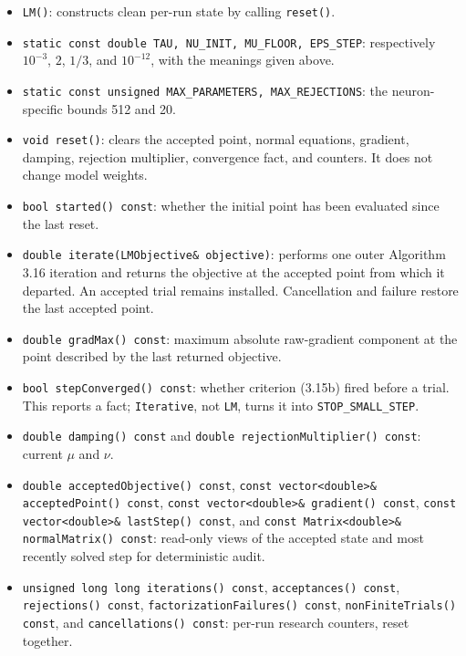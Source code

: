 \begin{itemize}
\item \texttt{LM()}: constructs clean per-run state by calling \texttt{reset()}.
\item \texttt{static const double TAU, NU\_INIT, MU\_FLOOR, EPS\_STEP}:
      respectively $10^{-3}$, $2$, $1/3$, and $10^{-12}$, with the meanings
      given above.
\item \texttt{static const unsigned MAX\_PARAMETERS, MAX\_REJECTIONS}:
      the neuron-specific bounds 512 and 20.
\item \texttt{void reset()}: clears the accepted point, normal equations,
      gradient, damping, rejection multiplier, convergence fact, and counters.
      It does not change model weights.
\item \texttt{bool started() const}: whether the initial point has been
      evaluated since the last reset.
\item \texttt{double iterate(LMObjective\& objective)}: performs one outer
      Algorithm 3.16 iteration and returns the objective at the accepted point
      from which it departed. An accepted trial remains installed. Cancellation
      and failure restore the last accepted point.
\item \texttt{double gradMax() const}: maximum absolute raw-gradient component
      at the point described by the last returned objective.
\item \texttt{bool stepConverged() const}: whether criterion (3.15b) fired
      before a trial. This reports a fact; \texttt{Iterative}, not \texttt{LM},
      turns it into \texttt{STOP\_SMALL\_STEP}.
\item \texttt{double damping() const} and
      \texttt{double rejectionMultiplier() const}: current $\mu$ and $\nu$.
\item \texttt{double acceptedObjective() const},
      \texttt{const vector<double>\& acceptedPoint() const},
      \texttt{const vector<double>\& gradient() const},
      \texttt{const vector<double>\& lastStep() const}, and
      \texttt{const Matrix<double>\& normalMatrix() const}: read-only views of
      the accepted state and most recently solved step for deterministic audit.
\item \texttt{unsigned long long iterations() const},
      \texttt{acceptances() const}, \texttt{rejections() const},
      \texttt{factorizationFailures() const},
      \texttt{nonFiniteTrials() const}, and \texttt{cancellations() const}:
      per-run research counters, reset together.
\end{itemize}

